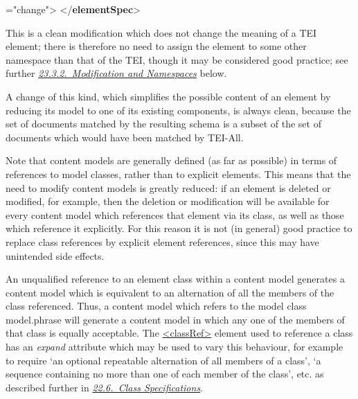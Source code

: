 \begin{shaded}
{\hspace*{1em}{mode}="{change}">}\mbox{}\newline 
{}\mbox{}\newline 
\hspace*{1em}\mbox{}\newline 
{}\mbox{}\newline 
{</\textbf{elementSpec}>}\end{shaded}\egroup\par \par
This is a clean modification which does not change the meaning of a TEI element; there is therefore no need to assign the element to some other namespace than that of the TEI, though it may be considered good practice; see further \textit{\hyperref[MDNS]{23.3.2.\ Modification and Namespaces}} below.\par
A change of this kind, which simplifies the possible content of an element by reducing its model to one of its existing components, is always clean, because the set of documents matched by the resulting schema is a subset of the set of documents which would have been matched by TEI-All.\par
Note that content models are generally defined (as far as possible) in terms of references to model classes, rather than to explicit elements. This means that the need to modify content models is greatly reduced: if an element is deleted or modified, for example, then the deletion or modification will be available for every content model which references that element via its class, as well as those which reference it explicitly. For this reason it is not (in general) good practice to replace class references by explicit element references, since this may have unintended side effects. \par
An unqualified reference to an element class within a content model generates a content model which is equivalent to an alternation of all the members of the class referenced. Thus, a content model which refers to the model class \textsf{model.phrase} will generate a content model in which any one of the members of that class is equally acceptable. The \hyperref[TEI.classRef]{<classRef>} element used to reference a class has an {\itshape expand} attribute which may be used to vary this behaviour, for example to require ‘an optional repeatable alternation of all members of a class’, ‘a sequence containing no more than one of each member of the class’, etc. as described further in \textit{\hyperref[TDCLA]{22.6.\ Class Specifications}}.\par
